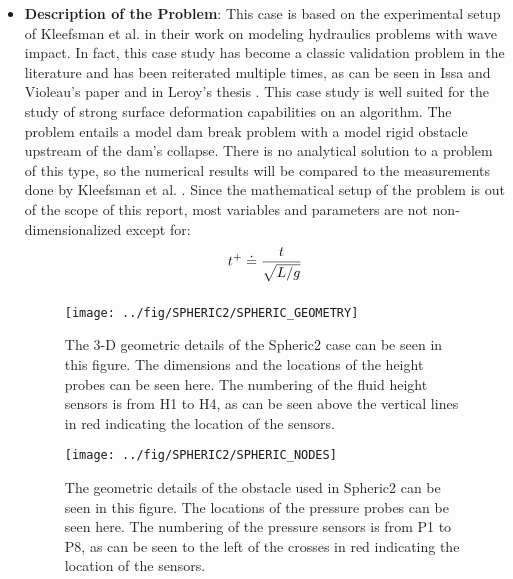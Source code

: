 \documentclass{../GPUSPHtemplate}
\begin{document}
\begin{itemize}
\item \textbf{Description of the Problem}: This case is based on the experimental setup of Kleefsman et al. \citep{Kleefsman}
  in their work on modeling hydraulics problems with wave impact.
  In fact, this case study has become a classic validation problem in the literature and has been reiterated multiple times,
  as can be seen in Issa and Violeau's paper \citep{SPHERIC} and in Leroy's thesis \citep{AgnesLeroy}. This case study is well
  suited for the study of strong surface deformation capabilities on an algorithm. The problem entails a model dam break
  problem with a model rigid obstacle upstream of the dam's collapse. There is no analytical solution to a problem of this type,
  so the numerical results will be compared to the measurements done by Kleefsman et al. \citep{Kleefsman}.
  Since the mathematical setup of the problem is out of the scope of this report, most variables and parameters are not non-dimensionalized except for: 
  \begin{equation}
    \begin{array}{l}
      \displaystyle{  t^{+} \doteq \frac{t}{\sqrt{L/g}} } \medskip \\ 
    \end{array}
    \end{equation}  

  \begin{figure}[h!]
    \texttt{[image: ../fig/SPHERIC2/SPHERIC\_GEOMETRY]}
    \centering
    \caption{ The 3-D geometric details of the Spheric2 case can be seen in this figure. The dimensions and the locations of the height probes can be seen here. The numbering of the fluid height sensors is from H1 to H4, as can be seen above the vertical lines in red indicating the location of the sensors.}
    \label{fig:SphericGeometry}
  \end{figure}
  
  \begin{figure}[h!]
    \texttt{[image: ../fig/SPHERIC2/SPHERIC\_NODES]}
    \centering
    \caption{ The geometric details of the obstacle used in Spheric2 can be seen in this figure. The locations of the pressure probes can be seen here. The numbering of the pressure sensors is from P1 to P8, as can be seen to the left of the crosses in red indicating the location of the sensors.}
    \label{fig:Spheric_Nodes}
  \end{figure}
  

\end{itemize}
\end{document}
